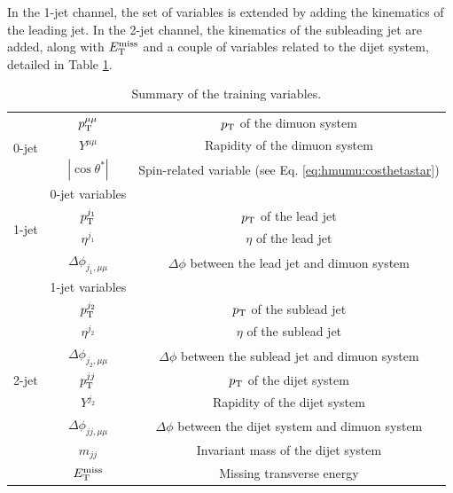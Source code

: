 In the 1-jet channel, the set of variables is 
extended by adding the kinematics of the leading jet. In the 2-jet
channel, the kinematics of the subleading jet are added, along with
$E_\text{T}^\text{miss}$ and a couple of variables related to the dijet system,
detailed in Table \ref{tab:hmumu:variables}.
\begin{table}[h]
\centering
\caption{Summary of the training variables.}
\label{tab:hmumu:variables}
\begin{tabular}{c c c}
\toprule
\midrule
\multirow{3}{*}{0-jet} & $p_{\text{T}}^{\mu\mu}$      & $p_{\text{T}}$ of the dimuon system \\
                       & $Y^{\mu\mu}$        & Rapidity of the dimuon system\\
                       & $|\cos{\theta^*}|$   & Spin-related variable (see Eq. \ref{eq:hmumu:costhetastar}) \\
\midrule
\multirow{4}{*}{1-jet} & 0-jet variables            &  \\
                       & $p_{\text{T}}^{j_1}$                & $p_{\text{T}}$ of the lead jet \\
                       & $\eta^{j_1}$               & $\eta$ of the lead jet \\
                       & $\Delta \phi_{j_1,\mu\mu}$ & $\Delta \phi$ between the lead jet and dimuon system \\
\midrule
\multirow{9}{*}{2-jet} & 1-jet variables            &  \\
                       & $p_{\text{T}}^{j_2}$                & $p_{\text{T}}$ of the sublead jet \\
                       & $\eta^{j_2}$               & $\eta$ of the sublead jet \\
                       & $\Delta \phi_{j_2,\mu\mu}$ & $\Delta \phi$ between the sublead jet and dimuon system \\
                       & $p_{\text{T}}^{jj}$                 & $p_{\text{T}}$ of the dijet system \\
                       & $Y^{j_2}$                  & Rapidity of the dijet system \\
                       & $\Delta \phi_{jj,\mu\mu}$  & $\Delta \phi$ between the dijet system and dimuon system \\
                       & $m_{jj}$                   & Invariant mass of the dijet system \\
                       & $E_\text{T}^\text{miss}$                     & Missing transverse energy \\
\midrule
\bottomrule
\end{tabular}
\end{table}


